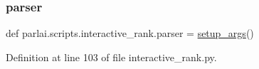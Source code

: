 \subsubsection{\texorpdfstring{parser}{parser}}
{\footnotesize\ttfamily def parlai.\+scripts.\+interactive\+\_\+rank.\+parser = \hyperlink{namespaceparlai_1_1scripts_1_1interactive__rank_af87c6b5d3f8843e51461c9cfd75fd510}{setup\+\_\+args}()}



Definition at line 103 of file interactive\+\_\+rank.\+py.

